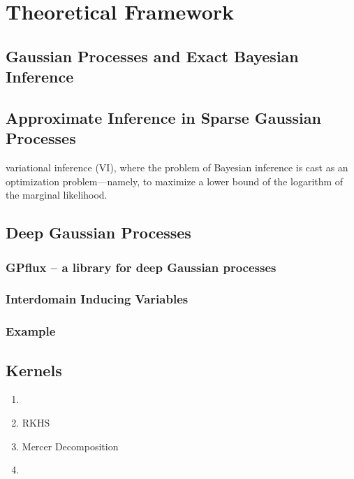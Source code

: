 
\chapter{Theoretical Framework}
\label{chapter:theoretical-framework}
{}

\section{Gaussian Processes and Exact Bayesian Inference}

\section{Approximate Inference in Sparse Gaussian Processes}
variational inference (VI), where the problem of Bayesian inference is cast as an optimization problem—namely, to maximize a lower bound of the logarithm of the marginal likelihood.


\section{Deep Gaussian Processes}

\subsection{GPflux -- a library for deep Gaussian processes}


\subsection{Interdomain Inducing Variables}

\subsection{Example}

\section{Kernels}

\begin{enumerate}
  \item 
  \item RKHS
  \item Mercer Decomposition
  \item 
\end{enumerate}
